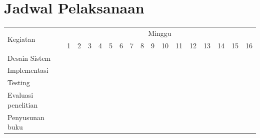 \section{Jadwal Pelaksanaan}

\newcommand{\w}{}
\newcommand{\G}{\cellcolor{gray}}
\begin{table}[H]
  \label{tbl:timeline}
  \begin{tabular}{|p{3.5cm}|c|c|c|c|c|c|c|c|c|c|c|c|c|c|c|c|}

    \hline
    \multirow{2}{*}{Kegiatan} & \multicolumn{16}{|c|}{Minggu}                                                                       \\
    \cline{2-17}              &
    1                         & 2                             & 3  & 4  & 5  & 6  & 7  & 8  & 9  & 10 & 11 & 12 & 13 & 14 & 15 & 16 \\
    \hline

    Desain Sistem             &
    \G                        & \G                            & \G & \G & \w & \w & \w & \w & \w & \w & \w & \w & \w & \w & \w & \w \\
    \hline

    Implementasi              &
    \w                        & \w                            & \G & \G & \G & \G & \G & \G & \G & \G & \G & \G & \w & \w & \w & \w \\
    \hline

    Testing                   &
    \w                        & \w                            & \w & \w & \w & \w & \w & \w & \w & \w & \G & \G & \G & \w & \w & \w \\
    \hline

    Evaluasi penelitian       &
    \w                        & \w                            & \w & \w & \w & \w & \w & \w & \w & \w & \w & \w & \G & \G & \G & \G \\
    \hline

    Penyusunan buku           &
    \w                        & \w                            & \w & \w & \w & \G & \G & \G & \G & \G & \G & \G & \G & \G & \G & \G \\
    \hline
  \end{tabular}
\end{table}
